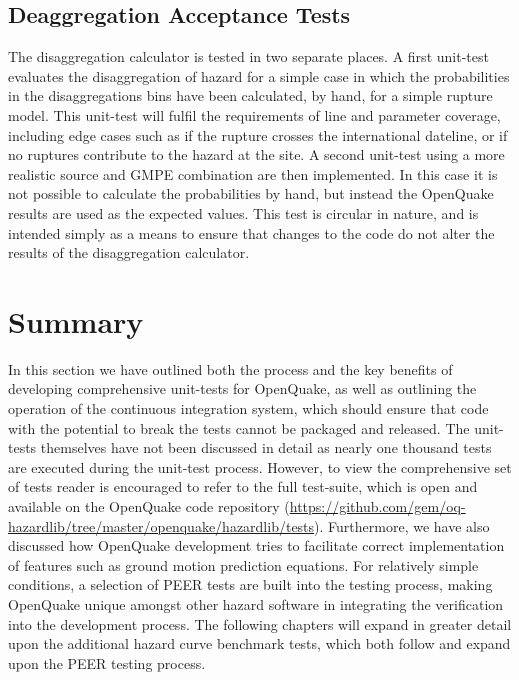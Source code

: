 \subsection{Deaggregation Acceptance Tests}
The disaggregation calculator is tested in two separate places. 
A first unit-test evaluates the disaggregation of hazard for a 
simple case in which the probabilities in the disaggregations bins
have been calculated, by hand, for a simple rupture model. 
%
This unit-test will fulfil the requirements of line and parameter 
coverage, including edge cases such as if the rupture crosses the 
international dateline, or if no ruptures contribute to the hazard 
at the site. A second unit-test using a more realistic source and 
GMPE combination are then implemented. In this case it is not 
possible to calculate the probabilities by hand, but instead the 
OpenQuake results are used as the expected values. 
%
This test is circular in nature, and is intended simply as a means 
to ensure that changes to the code do not alter the results of the 
disaggregation calculator.

%
\section{Summary}
In this section we have outlined both the process and the key benefits 
of developing comprehensive unit-tests for OpenQuake, as well as 
outlining the operation of the continuous integration system, which
should ensure that code with the potential to break the tests cannot
be packaged and released. The unit-tests themselves have not been 
discussed in detail as nearly one thousand tests are executed during 
the unit-test process. However, to view the comprehensive set of tests
reader is encouraged to refer to the full test-suite, which is open 
and available on the OpenQuake code repository 
(\href{https://github.com/gem/oq-hazardlib/tree/master/openquake/hazardlib/tests}{https://github.com/gem/oq-hazardlib/tree/master/openquake/hazardlib/tests}). 
%
Furthermore, we have also discussed how OpenQuake development tries to
facilitate correct implementation of features such as ground motion
prediction equations. For relatively simple conditions, a selection
of PEER tests \citep{thomas2010} are built into the testing process,
making OpenQuake unique amongst other hazard software in integrating
the verification into the development process. 
%
The following chapters will expand in greater detail upon the additional
hazard curve benchmark tests, which both follow and expand upon the 
PEER testing process. 


